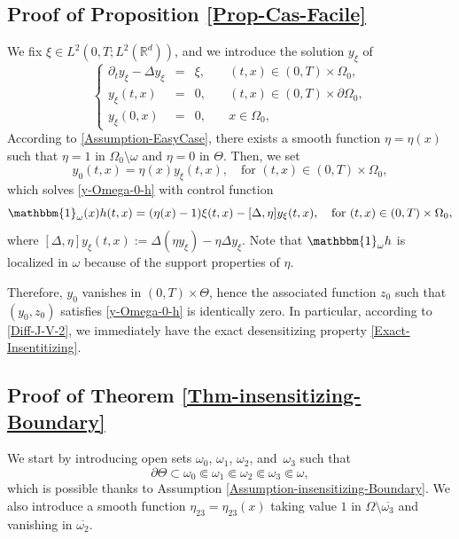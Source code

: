 \documentclass[JEP,XML,SOM,Unicode,NoFloatCountersInSection]{cedram}
\newcommand\R{{\mathbb R}}
\theoremstyle{definition}
\begin{document}
\subsection{Proof of Proposition \ref{Prop-Cas-Facile}}
\label{Sec-Proof-Prop-Cas-Facile}
We fix $\xi \in L^2(0,T; L^2(\R^d))$, and we introduce the solution $y_\xi$ of
\begin{equation*}
\left\{
\begin{array}{rcll}
\partial_t y_\xi - \Delta y_\xi &=& \xi, \quad & (t,x) \in (0,T) \times \Omega_0,
\\
y_\xi(t, x) &=& 0, \quad & (t,x) \in (0,T) \times \partial \Omega_0,
\\
y_\xi(0,x) &=& 0, \quad & x \in \Omega_0,
\end{array}
\right.
\end{equation*}
According to \eqref{Assumption-EasyCase}, there exists a smooth function $\eta = \eta(x)$ such that $\eta = 1$ in $\Omega_0 \setminus \omega$ and $\eta=0$ in $\Theta$. Then, we set
\[
y_0(t,x) = \eta(x) y_\xi(t,x), \quad \text{for } (t,x) \in (0,T) \times \Omega_0,
\]
which solves \eqref{y-Omega-0-h} with control function
\[
\mathbbm{1}_{\omega}(x)h(t,x) = (\eta(x) -1) \xi(t,x) - [\Delta, \eta] y_\xi(t,x), \quad \text{for } (t,x) \in (0,T) \times \Omega_0,
\]
where $[\Delta, \eta] y_\xi(t,x):=\Delta (\eta y_\xi)-\eta \Delta y_\xi$. Note that $\mathbbm{1}_{\omega} h$ is localized in $\omega$ because of the support properties of $\eta$.

Therefore, $y_0$ vanishes in $(0,T) \times \Theta$, hence the associated function $z_0$ such that $(y_0,z_0)$ satisfies \eqref{y-Omega-0-h} is identically zero. In particular, according to \eqref{Diff-J-V-2}, we immediately have the exact desensitizing property \eqref{Exact-Insentitizing}.

\subsection{Proof of Theorem \ref{Thm-insensitizing-Boundary}}
\label{Sec-Proof-Thm-insensitizing-Boundary}

We start by introducing open sets $\omega_0$, $\omega_1$, $\omega_2$, and~$\omega_3$ such that
\begin{equation*}
\partial \Theta \subset \omega_0 \Subset \omega_1 \Subset \omega_2 \Subset \omega_3 \Subset \omega,
\end{equation*}
which is possible thanks to Assumption \eqref{Assumption-insensitizing-Boundary}.
We also introduce a smooth function $\eta_{23} = \eta_{23}(x)$ taking value $1$ in $\Omega \setminus \overline{\omega_3}$ and vanishing in $\overline{\omega_2}$.
\end{document}
